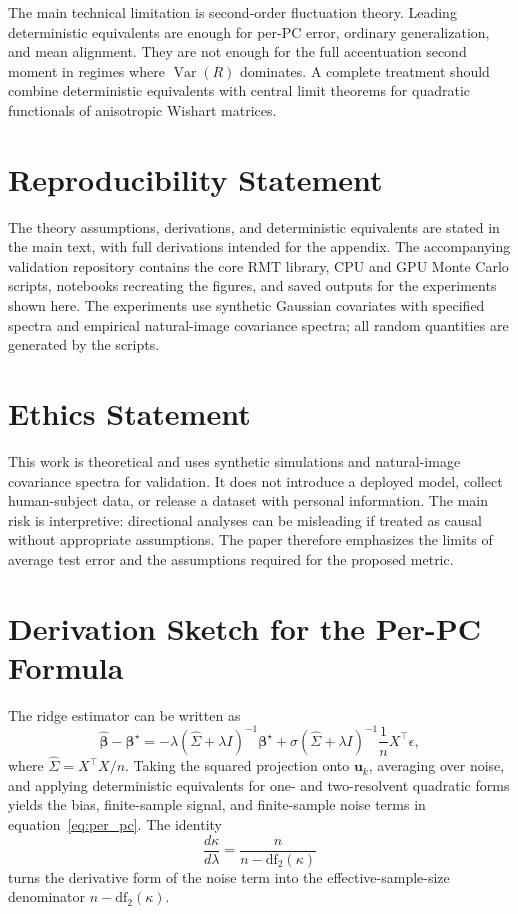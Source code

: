 \documentclass{article}
\newcommand{\bhat}{\widehat{\boldsymbol{\beta}}}
\newcommand{\btrue}{\boldsymbol{\beta}^{\star}}
\newcommand{\uhat}{\mathbf{u}}
\newcommand{\df}{\mathrm{df}_{2}}
\begin{document}
The main technical limitation is second-order fluctuation theory. Leading deterministic equivalents are enough for per-PC error, ordinary generalization, and mean alignment. They are not enough for the full accentuation second moment in regimes where $\operatorname{Var}(R)$ dominates. A complete treatment should combine deterministic equivalents with central limit theorems for quadratic functionals of anisotropic Wishart matrices.

\section{Reproducibility Statement}

The theory assumptions, derivations, and deterministic equivalents are stated in the main text, with full derivations intended for the appendix. The accompanying validation repository contains the core RMT library, CPU and GPU Monte Carlo scripts, notebooks recreating the figures, and saved outputs for the experiments shown here. The experiments use synthetic Gaussian covariates with specified spectra and empirical natural-image covariance spectra; all random quantities are generated by the scripts.

\section{Ethics Statement}

This work is theoretical and uses synthetic simulations and natural-image covariance spectra for validation. It does not introduce a deployed model, collect human-subject data, or release a dataset with personal information. The main risk is interpretive: directional analyses can be misleading if treated as causal without appropriate assumptions. The paper therefore emphasizes the limits of average test error and the assumptions required for the proposed metric.




\appendix
\section{Derivation Sketch for the Per-PC Formula}

The ridge estimator can be written as
\begin{equation}
    \bhat-\btrue
    =
    -\lambda(\widehat{\Sigma}+\lambda I)^{-1}\btrue
    +
    \sigma(\widehat{\Sigma}+\lambda I)^{-1}\frac{1}{n}X^\top\epsilon,
\end{equation}
where $\widehat{\Sigma}=X^\top X/n$. Taking the squared projection onto $\uhat_k$, averaging over noise, and applying deterministic equivalents for one- and two-resolvent quadratic forms yields the bias, finite-sample signal, and finite-sample noise terms in equation~\ref{eq:per_pc}. The identity
\begin{equation}
    \frac{d\kappa}{d\lambda}=\frac{n}{n-\df(\kappa)}
\end{equation}
turns the derivative form of the noise term into the effective-sample-size denominator $n-\df(\kappa)$.
\end{document}
